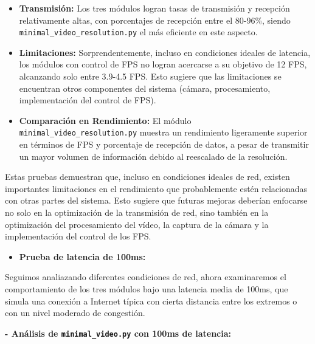 \begin{itemize}
    \item \textbf{Transmisión:} Los tres módulos logran tasas de transmisión y recepción relativamente altas, con porcentajes de recepción entre el 80-96\%, siendo \texttt{minimal\_video\_resolution.py} el más eficiente en este aspecto.
    
    \item \textbf{Limitaciones:} Sorprendentemente, incluso en condiciones ideales de latencia, los módulos con control de FPS no logran acercarse a su objetivo de 12 FPS, alcanzando solo entre 3.9-4.5 FPS. Esto sugiere que las limitaciones se encuentran otros componentes del sistema (cámara, procesamiento, implementación del control de FPS).
    
    \item \textbf{Comparación en Rendimiento:} El módulo \texttt{minimal\_video\_resolution.py} muestra un rendimiento ligeramente superior en términos de FPS y porcentaje de recepción de datos, a pesar de transmitir un mayor volumen de información debido al reescalado de la resolución.

  \end{itemize}

Estas pruebas demuestran que, incluso en condiciones ideales de red, existen importantes limitaciones en el rendimiento que probablemente estén relacionadas con otras partes del sistema. Esto sugiere que futuras mejoras deberían enfocarse no solo en la optimización de la transmisión de red, sino también en la optimización del procesamiento del vídeo, la captura de la cámara y la implementación del control de los FPS.

\newpage

\begin{itemize}
  \item \textbf{Prueba de latencia de 100ms:}
\end{itemize}

Seguimos analiazando diferentes condiciones de red, ahora examinaremos el comportamiento de los tres módulos bajo una latencia media de 100ms, que simula una conexión a Internet típica con cierta distancia entre los extremos o con un nivel moderado de congestión.

\vspace{\baselineskip}

\textbf{- Análisis de \texttt{minimal\_video.py} con 100ms de latencia:}
\vspace{\baselineskip}

